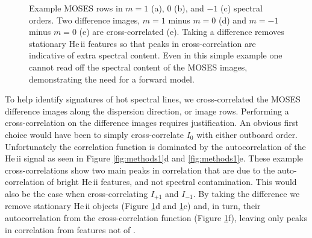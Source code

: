 \begin{figure}
 	 		\caption{Example MOSES rows in $m = 1$ (a), 0 (b), and $-1$ (c) spectral orders.  Two difference images, $m=1$ minus $m=0$ (d) and $m=-1$ minus $m=0$ (e) are cross-correlated (e).  Taking a difference removes stationary He\,{\sc ii} features so that peaks in cross-correlation are indicative of extra spectral content.  Even in this simple example one cannot read off the spectral content of the MOSES images, demonstrating the need for a forward model.}
 	 		\label{fig:methods2}
 	 	\end{figure}
        
        To help identify signatures of hot spectral lines, we cross-correlated the MOSES difference images along the dispersion direction, or image rows.
        Performing a cross-correlation on the difference images requires justification.  
        An obvious first choice would have been to simply cross-correlate $I_0$ with either outboard order.  
        Unfortunately the correlation function is dominated by the autocorrelation of the He\,{\sc ii} signal as seen in Figure \ref{fig:methods1}d and \ref{fig:methods1}e.  
        These example cross-correlations show two main peaks in correlation that are due to the auto-correlation of bright He\,{\sc ii} features, and not spectral contamination.  
        This would also be the case when cross-correlating $I_{+1}$ and $I_{-1}$.  
        By taking the difference we remove stationary He\,{\sc ii} objects (Figure \ref{fig:methods2}d and \ref{fig:methods2}e) and, in turn, their autocorrelation from the cross-correlation function (Figure \ref{fig:methods2}f), leaving only peaks in correlation from features not of \heii.
 	
